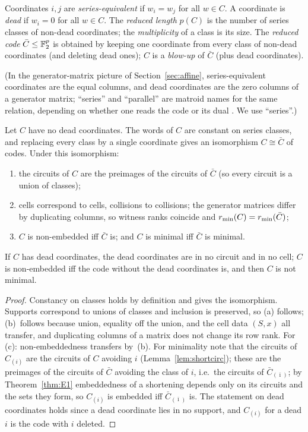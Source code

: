 \begin{definition}\label{def:series}
Coordinates $i,j$ are \emph{series-equivalent} if $w_i=w_j$ for all $w\in C$. A coordinate is \emph{dead} if $w_i=0$ for all $w\in C$. The \emph{reduced length} $p(C)$ is the number of series classes of non-dead coordinates; the \emph{multiplicity} of a class is its size. The \emph{reduced code} $\bar C\le\mathbb F_2^{p}$ is obtained by keeping one coordinate from every class of non-dead coordinates (and deleting dead ones); $C$ is a \emph{blow-up} of $\bar C$ (plus dead coordinates).
\end{definition}

(In the generator-matrix picture of Section~\ref{sec:affine}, series-equivalent coordinates are the equal columns, and dead coordinates are the zero columns of a generator matrix; ``series'' and ``parallel'' are matroid names for the same relation, depending on whether one reads the code or its dual \cite{Oxley2011}. We use ``series''.)

\begin{proposition}\label{prop:series}
Let $C$ have no dead coordinates. The words of $C$ are constant on series classes, and replacing every class by a single coordinate gives an isomorphism $C\cong\bar C$ of codes. Under this isomorphism:
\begin{enumerate}[label=(\alph*)]
\item the circuits of $C$ are the preimages of the circuits of $\bar C$ (so every circuit is a union of classes);
\item cells correspond to cells, collisions to collisions; the generator matrices differ by duplicating columns, so witness ranks coincide and $r_{\min}(C)=r_{\min}(\bar C)$;
\item $C$ is non-embedded iff $\bar C$ is; and $C$ is minimal iff $\bar C$ is minimal.
\end{enumerate}
If $C$ has dead coordinates, the dead coordinates are in no circuit and in no cell; $C$ is non-embedded iff the code without the dead coordinates is, and then $C$ is not minimal.
\end{proposition}

\begin{proof}
Constancy on classes holds by definition and gives the isomorphism. Supports correspond to unions of classes and inclusion is preserved, so (a) follows; (b)~follows because union, equality off the union, and the cell data $(S,x)$ all transfer, and duplicating columns of a matrix does not change its row rank. For (c): non-embeddedness transfers by~(b). For minimality note that the circuits of $C_{(i)}$ are the circuits of $C$ avoiding $i$ (Lemma~\ref{lem:shortcirc}); these are the preimages of the circuits of $\bar C$ avoiding the class of $i$, i.e.\ the circuits of $\bar C_{(\bar\imath)}$; by Theorem~\ref{thm:E1} embeddedness of a shortening depends only on its circuits and the sets they form, so $C_{(i)}$ is embedded iff $\bar C_{(\bar\imath)}$ is. The statement on dead coordinates holds since a dead coordinate lies in no support, and $C_{(i)}$ for a dead $i$ is the code with $i$ deleted.
\end{proof}

